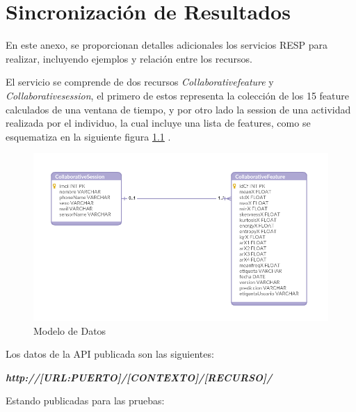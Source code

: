 


\chapter{Sincronización de Resultados}

\label{chapA:rest-api}

En este anexo, se proporcionan detalles adicionales los servicios RESP para realizar, incluyendo ejemplos y relación entre los recursos.

El servicio se comprende de dos recursos \textit{Collaborativefeature} y \textit{Collaborativesession}, el primero de estos representa la colección de los 15 feature calculados de una ventana de tiempo, y por otro lado la session de una actividad realizada por el individuo, la cual incluye una lista de features, como se esquematiza en la siguiente figura \ref{fig:der} .

\begin{figure}[!htbp]
	\centering
	\includegraphics[width=0.7\linewidth]{anexos/der}
	\caption[Modelo de Datos]{\label{fig:der}Modelo de Datos}
\end{figure}

Los datos de la API publicada son las siguientes:

\textit{\textbf{http://[URL:PUERTO]/[CONTEXTO]/[RECURSO]/}}

Estando publicadas para las pruebas:

